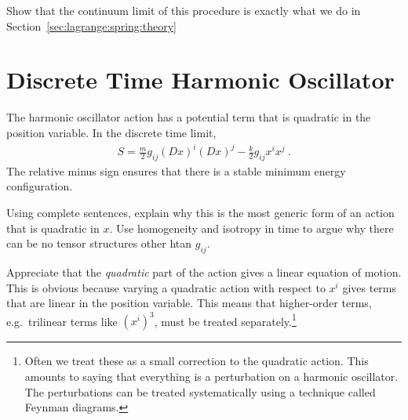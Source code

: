 \begin{exercise}
Show that the continuum limit of this procedure is exactly what we do in Section~\ref{sec:lagrange:spring:theory}
\end{exercise}



\section{Discrete Time Harmonic Oscillator}

The harmonic oscillator action has a potential term that is quadratic in the position variable. In the discrete time limit,
\begin{align}
    S = 
        \frac{m}{2} g_{ij}(Dx)^i(Dx)^j 
        - \frac{k}{2} g_{ij} x^i x^j \ .
\end{align}
The relative minus sign ensures that there is a stable minimum energy configuration.
\begin{exercise}
Using complete sentences, explain why this is the most generic form of an action that is quadratic in $x$. Use homogeneity and isotropy in time to argue why there can be no tensor structures other htan $g_{ij}$.
\end{exercise}

Appreciate that the \emph{quadratic} part of the action gives a linear equation of motion. This is obvious because varying a quadratic action with respect to $x^i$ gives terms that are linear in the position variable. This means that higher-order terms, e.g.\ trilinear terms like $(x^i)^3$, must be treated separately.\footnote{Often we treat these as a small correction to the quadratic action. This amounts to saying that everything is a perturbation on a harmonic oscillator. The perturbations can be treated systematically using a technique called Feynman diagrams.}
% 
% 


